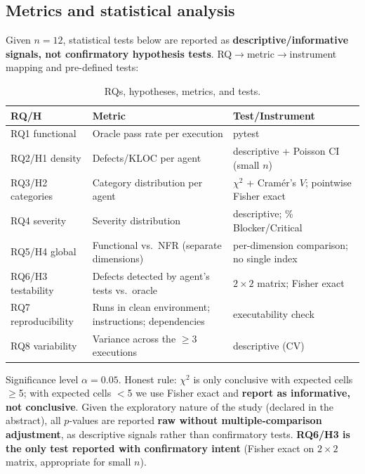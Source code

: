 \documentclass[11pt]{article}
\begin{document}
\subsection{Metrics and statistical analysis}

Given $n=12$, statistical tests below are reported as \textbf{descriptive/informative signals, not confirmatory hypothesis tests}. RQ$\rightarrow$metric$\rightarrow$instrument mapping and pre-defined tests:

\begin{table}[htbp]
  \centering
  \caption{RQs, hypotheses, metrics, and tests.}
  \label{tab:rq}
  \begin{tabular}{lll}
    \toprule
    RQ/H & Metric & Test/Instrument \\
    \midrule
    RQ1 functional & Oracle pass rate per execution & pytest \\
    RQ2/H1 density & Defects/KLOC per agent & descriptive + Poisson CI (small $n$) \\
    RQ3/H2 categories & Category distribution per agent & $\chi^2$ + Cram\'er's $V$; pointwise Fisher exact \\
    RQ4 severity & Severity distribution & descriptive; \% Blocker/Critical \\
    RQ5/H4 global & Functional vs.\ NFR (separate dimensions) & per-dimension comparison; no single index \\
    RQ6/H3 testability & Defects detected by agent's tests vs.\ oracle & $2\times2$ matrix; Fisher exact \\
    RQ7 reproducibility & Runs in clean environment; instructions; dependencies & executability check \\
    RQ8 variability & Variance across the $\geq$3 executions & descriptive (CV) \\
    \bottomrule
  \end{tabular}
\end{table}

Significance level $\alpha=0.05$. Honest rule: $\chi^2$ is only conclusive with expected cells $\geq$5; with expected cells $<$5 we use Fisher exact and \textbf{report as informative, not conclusive}. Given the exploratory nature of the study (declared in the abstract), all $p$-values are reported \textbf{raw without multiple-comparison adjustment}, as descriptive signals rather than confirmatory tests. \textbf{RQ6/H3 is the only test reported with confirmatory intent} (Fisher exact on $2\times2$ matrix, appropriate for small $n$).
\end{document}
